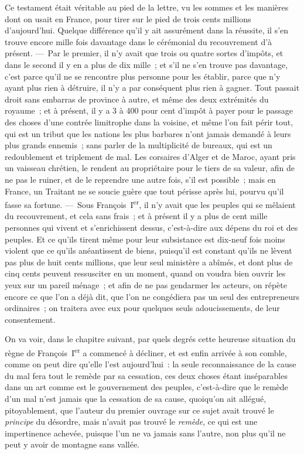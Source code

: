 \documentclass[french,twoside]{book} %
\begin{document}
Ce testament était véritable au pied de la lettre, vu les sommes et les manières dont on usait en France, pour tirer sur le pied de trois cents millions d’aujourd’hui. Quelque différence qu’il y ait assurément dans la réussite, il s’en trouve encore mille fois davantage dans le cérémonial du recouvrement d’à présent. — Par le premier, il n’y avait que trois ou quatre sortes d’impôts, et dans le second il y en a plus de dix mille ; et s’il ne s’en trouve pas davantage, c’est parce qu’il ne se rencontre plus personne pour les établir, parce que n’y ayant plus rien à détruire, il n’y a par conséquent plus rien à gagner. Tout passait droit sans embarras de province à autre, et même des deux extrémités du royaume ; et à présent, il y a 3 à 400 pour cent d’impôt à payer pour le passage des choses d’une contrée limitrophe dans la voisine, et même l’on fait périr tout, qui est un tribut que les nations les plus barbares n’ont jamais demandé à leurs plus grands ennemis ; sans parler de la multiplicité de bureaux, qui est un redoublement et triplement de mal. Les corsaires d’Alger et de Maroc, ayant pris un vaisseau chrétien, le rendent au propriétaire pour le tiers de sa valeur, afin de ne pas le ruiner, et de le reprendre une autre fois, s’il est possible ; mais en France, un Traitant ne se soucie guère que tout périsse après lui, pourvu qu’il fasse sa fortune. — Sous François I\textsuperscript{er}, il n’y avait que les peuples qui se mêlaient du recouvrement, et cela sans frais ; et à présent il y a plus de cent mille personnes qui vivent et s’enrichissent dessus, c’est-à-dire aux dépens du roi et des peuples. Et ce qu’ils tirent même pour leur subsistance est dix-neuf fois moins violent que ce qu’ils anéantissent de biens, puisqu’il est constant qu’ils ne lèvent pas plus de huit cents millions, que leur seul ministère a abîmés, et dont plus de cinq cents peuvent ressusciter en un moment, quand on voudra bien ouvrir les yeux sur un pareil ménage ; et afin de ne pas gendarmer les acteurs, on répète encore ce que l’on a déjà dit, que l’on ne congédiera pas un seul des entrepreneurs ordinaires ; on traitera avec eux pour quelques seuls adoucissements, de leur consentement.\par
On va voir, dans le chapitre suivant, par quels degrés cette heureuse situation du règne de François I\textsuperscript{er} a commencé à décliner, et est enfin arrivée à son comble, comme on peut dire qu’elle l’est aujourd’hui : la seule reconnaissance de la cause du mal fera tout le remède par sa cessation, ces deux choses étant inséparables dans un art comme est le gouvernement des peuples, c’est-à-dire que le remède d’un mal n’est jamais que la cessation de sa cause, quoiqu’on ait allégué, pitoyablement, que l’auteur du premier ouvrage sur ce sujet avait trouvé le {\itshape principe} du désordre, mais n’avait pas trouvé le {\itshape remède}, ce qui est une impertinence achevée, puisque l’un ne va jamais sans l’autre, non plus qu’il ne peut y avoir de montagne sans vallée.
\end{document}
